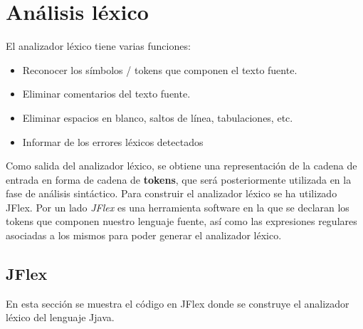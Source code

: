 \documentclass[12pt,a4paper]{article}
\begin{document}
	\clearpage

\section{Análisis léxico}
El analizador léxico tiene varias funciones:
\begin{itemize}
	\item Reconocer los símbolos / tokens que componen el texto fuente.
	\item Eliminar comentarios del texto fuente.
	\item Eliminar espacios en blanco, saltos de línea, tabulaciones, etc.
	\item Informar de los errores léxicos detectados
\end{itemize}

Como salida del analizador léxico, se obtiene una representación de la cadena de entrada en forma de cadena de \textbf{tokens}, que será posteriormente utilizada en la fase de análisis sintáctico. Para construir el analizador léxico se ha utilizado JFlex. 
\newline
\newline
Por un lado \textit{JFlex} es una herramienta software en la que se declaran los tokens que componen nuestro lenguaje fuente, así como las expresiones regulares asociadas a los mismos para poder generar el analizador léxico. \newline

\subsection{JFlex}

En esta sección se muestra el código en JFlex donde se construye el analizador léxico del lenguaje Jjava.

\begin{lstlisting}[caption=Analizador Léxico en JFlex]


\end{lstlisting}
\end{document}
